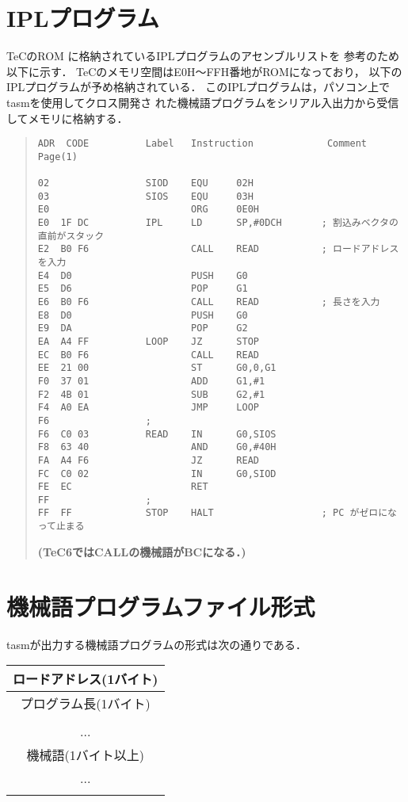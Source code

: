 \newpage
\section{IPLプログラム}\label{iplsrc}
TeCのROM に格納されているIPLプログラムのアセンブルリストを
参考のため以下に示す．
TeCのメモリ空間はE0H〜FFH番地がROMになっており，
以下のIPLプログラムが予め格納されている．
このIPLプログラムは，パソコン上でtasmを使用してクロス開発さ
れた機械語プログラムをシリアル入出力から受信してメモリに格納する．

\begin{quote}
\begin{verbatim}
ADR  CODE          Label   Instruction             Comment              Page(1)

02                 SIOD    EQU     02H            
03                 SIOS    EQU     03H            
E0                         ORG     0E0H           
E0  1F DC          IPL     LD      SP,#0DCH       ; 割込みベクタの直前がスタック
E2  B0 F6                  CALL    READ           ; ロードアドレスを入力
E4  D0                     PUSH    G0             
E5  D6                     POP     G1             
E6  B0 F6                  CALL    READ           ; 長さを入力
E8  D0                     PUSH    G0             
E9  DA                     POP     G2             
EA  A4 FF          LOOP    JZ      STOP           
EC  B0 F6                  CALL    READ           
EE  21 00                  ST      G0,0,G1        
F0  37 01                  ADD     G1,#1          
F2  4B 01                  SUB     G2,#1          
F4  A0 EA                  JMP     LOOP           
F6                 ;
F6  C0 03          READ    IN      G0,SIOS        
F8  63 40                  AND     G0,#40H        
FA  A4 F6                  JZ      READ           
FC  C0 02                  IN      G0,SIOD        
FE  EC                     RET                    
FF                 ;
FF  FF             STOP    HALT                   ; PC がゼロになって止まる
\end{verbatim}
{\bf(TeC6ではCALLの機械語がBCになる．)}
\end{quote}

\section{機械語プログラムファイル形式}
tasmが出力する機械語プログラムの形式は次の通りである．

\vspace{0.3cm}

{\small\bf
\begin{tabular}{|c|}
\hline
ロードアドレス(1バイト) \\
\hline
プログラム長(1バイト) \\
\hline
\\
...\\
機械語(1バイト以上) \\
...\\
\\
\hline
\end{tabular}
}
